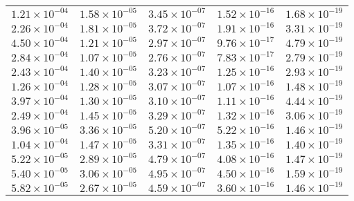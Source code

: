 \begin{table}
\begin{tabular}{lllll}
$\mathrm{1.21 \times 10^{-04}}$ & $\mathrm{1.58 \times 10^{-05}}$ & $\mathrm{3.45 \times 10^{-07}}$ & $\mathrm{1.52 \times 10^{-16}}$ & $\mathrm{1.68 \times 10^{-19}}$ \\
$\mathrm{2.26 \times 10^{-04}}$ & $\mathrm{1.81 \times 10^{-05}}$ & $\mathrm{3.72 \times 10^{-07}}$ & $\mathrm{1.91 \times 10^{-16}}$ & $\mathrm{3.31 \times 10^{-19}}$ \\
$\mathrm{4.50 \times 10^{-04}}$ & $\mathrm{1.21 \times 10^{-05}}$ & $\mathrm{2.97 \times 10^{-07}}$ & $\mathrm{9.76 \times 10^{-17}}$ & $\mathrm{4.79 \times 10^{-19}}$ \\
$\mathrm{2.84 \times 10^{-04}}$ & $\mathrm{1.07 \times 10^{-05}}$ & $\mathrm{2.76 \times 10^{-07}}$ & $\mathrm{7.83 \times 10^{-17}}$ & $\mathrm{2.79 \times 10^{-19}}$ \\
$\mathrm{2.43 \times 10^{-04}}$ & $\mathrm{1.40 \times 10^{-05}}$ & $\mathrm{3.23 \times 10^{-07}}$ & $\mathrm{1.25 \times 10^{-16}}$ & $\mathrm{2.93 \times 10^{-19}}$ \\
$\mathrm{1.26 \times 10^{-04}}$ & $\mathrm{1.28 \times 10^{-05}}$ & $\mathrm{3.07 \times 10^{-07}}$ & $\mathrm{1.07 \times 10^{-16}}$ & $\mathrm{1.48 \times 10^{-19}}$ \\
$\mathrm{3.97 \times 10^{-04}}$ & $\mathrm{1.30 \times 10^{-05}}$ & $\mathrm{3.10 \times 10^{-07}}$ & $\mathrm{1.11 \times 10^{-16}}$ & $\mathrm{4.44 \times 10^{-19}}$ \\
$\mathrm{2.49 \times 10^{-04}}$ & $\mathrm{1.45 \times 10^{-05}}$ & $\mathrm{3.29 \times 10^{-07}}$ & $\mathrm{1.32 \times 10^{-16}}$ & $\mathrm{3.06 \times 10^{-19}}$ \\
$\mathrm{3.96 \times 10^{-05}}$ & $\mathrm{3.36 \times 10^{-05}}$ & $\mathrm{5.20 \times 10^{-07}}$ & $\mathrm{5.22 \times 10^{-16}}$ & $\mathrm{1.46 \times 10^{-19}}$ \\
$\mathrm{1.04 \times 10^{-04}}$ & $\mathrm{1.47 \times 10^{-05}}$ & $\mathrm{3.31 \times 10^{-07}}$ & $\mathrm{1.35 \times 10^{-16}}$ & $\mathrm{1.40 \times 10^{-19}}$ \\
$\mathrm{5.22 \times 10^{-05}}$ & $\mathrm{2.89 \times 10^{-05}}$ & $\mathrm{4.79 \times 10^{-07}}$ & $\mathrm{4.08 \times 10^{-16}}$ & $\mathrm{1.47 \times 10^{-19}}$ \\
$\mathrm{5.40 \times 10^{-05}}$ & $\mathrm{3.06 \times 10^{-05}}$ & $\mathrm{4.95 \times 10^{-07}}$ & $\mathrm{4.50 \times 10^{-16}}$ & $\mathrm{1.59 \times 10^{-19}}$ \\
$\mathrm{5.82 \times 10^{-05}}$ & $\mathrm{2.67 \times 10^{-05}}$ & $\mathrm{4.59 \times 10^{-07}}$ & $\mathrm{3.60 \times 10^{-16}}$ & $\mathrm{1.46 \times 10^{-19}}$ \\

\end{tabular}
\end{table}
